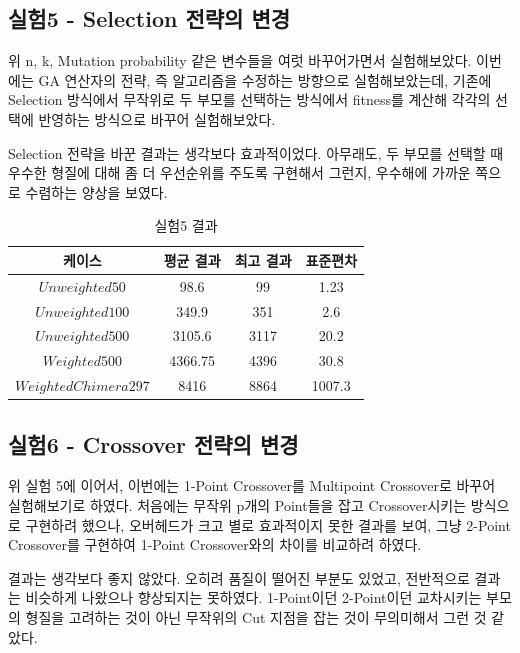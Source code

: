 \documentclass{article}
\begin{document}
\subsection{실험5 - Selection 전략의 변경}

위 n, k, Mutation probability 같은 변수들을 여럿 바꾸어가면서 실험해보았다. 이번에는 GA 연산자의 전략, 즉 알고리즘을 수정하는 방향으로 실험해보았는데, 기존에 Selection 방식에서 무작위로 두 부모를 선택하는 방식에서 fitness를 계산해 각각의 선택에 반영하는 방식으로 바꾸어 실험해보았다.

Selection 전략을 바꾼 결과는 생각보다 효과적이었다. 아무래도, 두 부모를 선택할 때 우수한 형질에 대해 좀 더 우선순위를 주도록 구현해서 그런지, 우수해에 가까운 쪽으로 수렴하는 양상을 보였다.


 \begin{table}[h]
 \begin{center}
\caption{실험5 결과}
\begin{tabular}{cccc}
\hline\hline
케이스 & 평균 결과 & 최고 결과 & 표준편차\\
\hline\hline
$Unweighted 50$ & 98.6 & 99 & 1.23\\
\hline
$Unweighted 100$ & 349.9 & 351 & 2.6\\
\hline
$Unweighted 500$ & 3105.6 & 3117 & 20.2\\
\hline
$Weighted 500$ & 4366.75 & 4396 & 30.8\\
\hline
$Weighted Chimera 297$ & 8416 & 8864 & 1007.3\\
\hline
\end{tabular}
\end{center}
\end{table}

\subsection{실험6 - Crossover 전략의 변경}

위 실험 5에 이어서, 이번에는 1-Point Crossover를 Multipoint Crossover로 바꾸어 실험해보기로 하였다. 처음에는 무작위 p개의 Point들을 잡고 Crossover시키는 방식으로 구현하려 했으나, 오버헤드가 크고 별로 효과적이지 못한 결과를 보여, 그냥 2-Point Crossover를 구현하여 1-Point Crossover와의 차이를 비교하려 하였다.

결과는 생각보다 좋지 않았다. 오히려 품질이 떨어진 부분도 있었고, 전반적으로 결과는 비슷하게 나왔으나 향상되지는 못하였다. 1-Point이던 2-Point이던 교차시키는 부모의 형질을 고려하는 것이 아닌 무작위의 Cut 지점을 잡는 것이 무의미해서 그런 것 같았다.
\end{document}
